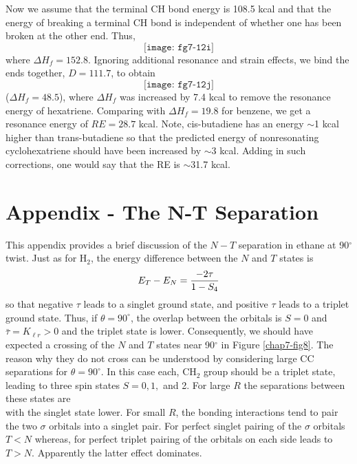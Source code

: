 Now we assume that the terminal CH bond energy is 
108.5 kcal and that the energy of breaking a terminal CH 
bond is independent of whether one has been broken at the 
other end. Thus,
\begin{equation}
\texttt{[image: fg7-12i]}
\label{chap7-eqno}
\end{equation}
where $\Delta H_f = 152.8$.
Ignoring additional resonance and strain effects, we bind the 
ends together, $D = 111.7$, to obtain
\begin{equation}
\texttt{[image: fg7-12j]}
\end{equation}
($\Delta H_f = 48.5$),
where $\Delta H_f$ was increased by 7.4 kcal to remove the resonance 
energy of hexatriene.  Comparing with $\Delta H_f = 19.8$ for benzene, 
we get a resonance energy of $RE = 28.7$ kcal.  
Note, cis-butadiene has an energy $\sim$1 kcal 
higher than trans-butadiene so that the predicted energy of 
nonresonating cyclohexatriene should have been increased by 
$\sim$3 kcal. Adding in such corrections, one would say that the 
RE is $\sim$31.7 kcal.

\section{Appendix - The N-T Separation}

This appendix provides a brief discussion of the $N-T$ separation in 
ethane at 90$^{\circ}$ twist.  Just as for H$_2$,
the energy difference between the $N$ and $T$ states is
\begin{equation}
E_T - E_N = {-2 \tau \over 1 - S_4}
\end{equation}
so that negative $\tau$ leads to a singlet ground state, and positive
$\tau$ leads to a triplet ground state.  Thus, if $\theta =
90^{\circ}$, the overlap between the orbitals is $S = 0$ and
${\bar{\tau}} = K_{\ell r} > 0$ and the triplet state is lower.
Consequently, we should have expected a crossing of the $N$ and $T$
states near 90$^{\circ}$ in Figure \ref{chap7-fig8}. The reason why
they do not cross can be understood by considering large CC
separations for $\theta = 90^{\circ}$.  In this case each, CH$_2$
group should be a triplet state, leading to three spin states $S = 0,
1,$ and 2.  For large $R$ the separations between these states are
\begin{equation}
\end{equation}
with the singlet state lower.  For small $R$, the bonding interactions 
tend to pair the two $\sigma$ orbitals into a singlet pair.  For perfect 
singlet pairing of the $\sigma$ orbitals $T < N$ 
whereas, for perfect triplet pairing of the orbitals on each side leads to
$T > N$.  Apparently the latter effect dominates.
